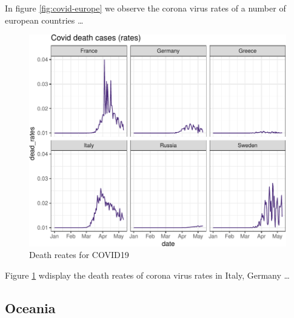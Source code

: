 \documentclass[11pt,a4paper,]{article}
\begin{document}
In figure \ref{fig:covid-europe} we observe the corona virus rates of a number of european countries \ldots{}

\begin{figure}

{\centering \includegraphics{Week8_demo_files/figure-latex/coviddeath1-1} 

}

\caption{Death reates for COVID19}\label{fig:coviddeath1}
\end{figure}

Figure \ref{fig:coviddeath1} wdisplay the death reates of corona virus rates in Italy, Germany \ldots{}

\clearpage

\hypertarget{oceania}{%
\subsection{Oceania}\label{oceania}}
\end{document}
